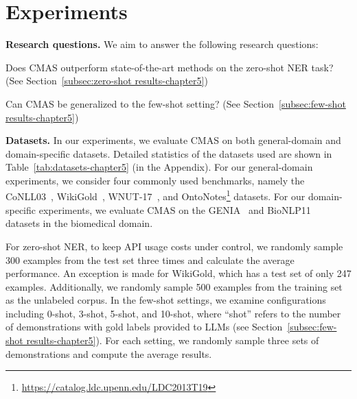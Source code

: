 \section{Experiments}

\textbf{Research questions.}
We aim to answer the following research questions: 
\begin{enumerate*}[label=(RQ\arabic*),leftmargin=*,nosep]
\item Does \ac{CMAS} outperform state-of-the-art methods on the zero-shot \ac{NER} task? (See Section~\ref{subsec:zero-shot results-chapter5})
\item Can \ac{CMAS} be generalized to the few-shot setting? (See Section~\ref{subsec:few-shot results-chapter5})
\end{enumerate*}

\noindent \textbf{Datasets.}
In our experiments, we evaluate \ac{CMAS} on both general-domain and domain-specific datasets. Detailed statistics of the datasets used are shown in Table~\ref{tab:datasets-chapter5} (in the Appendix).
For our general-domain experiments, we consider four commonly used benchmarks, namely the CoNLL03~\citep{DBLP:conf/conll/SangM03}, WikiGold~\citep{DBLP:conf/acl-pwnlp/BalasuriyaRNMC09}, WNUT-17~\citep{DBLP:conf/aclnut/DerczynskiNEL17}, and OntoNotes\footnote{\url{https://catalog.ldc.upenn.edu/LDC2013T19}} datasets. 
For our domain-specific experiments, we evaluate \ac{CMAS} on the GENIA~\citep{ohta2002genia} and BioNLP11~\citep{DBLP:journals/bmcbi/PyysaloORSMWSTA12} datasets in the biomedical domain.

For zero-shot NER, to keep API usage costs under control, we randomly sample 300 examples from the test set three times and calculate the average performance. An exception is made for WikiGold, which has a test set of only 247 examples. Additionally, we randomly sample 500 examples from the training set as the unlabeled corpus. 
In the few-shot settings, we examine configurations including 0-shot, 3-shot, 5-shot, and 10-shot, where ``shot'' refers to the number of demonstrations with gold labels provided to LLMs (see Section~\ref{subsec:few-shot results-chapter5}). For each setting, we randomly sample three sets of demonstrations and compute the average results.

